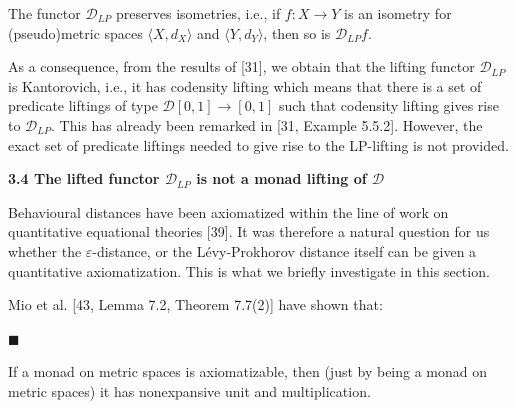 \documentclass[10pt,a4paper]{article}
\begin{document}
 
The functor $\mathcal{D}_{LP}$ preserves isometries, i.e., if $f\colon X\to Y$ is an isometry for (pseudo)metric spaces $\langle X,d_{X}\rangle$ and $\langle Y,d_{Y}\rangle$, then so is $\mathcal{D}_{LP}f$.\par
 
 
 
 
As a consequence, from the results of [31], we obtain that the lifting functor $\mathcal{D}_{LP}$ is Kantorovich, i.e., it has codensity lifting which means that there is a set of predicate liftings of type $\mathcal{D}[0,1]\to[0,1]$ such that codensity lifting gives rise to $\mathcal{D}_{LP}$. This has already been remarked in [31, Example 5.5.2]. However, the exact set of predicate liftings needed to give rise to the LP-lifting is not provided.\par
 
 
 
 
\par\medskip\noindent\textbf{3.4 The lifted functor $\mathcal{D}_{LP}$ is not a monad lifting of $\mathcal{D}$}\par
 
 
Behavioural distances have been axiomatized within the line of work on quantitative equational theories [39]. It was therefore a natural question for us whether the $\varepsilon$-distance, or the Lévy-Prokhorov distance itself can be given a quantitative axiomatization. This is what we briefly investigate in this section.\par
 
 
 
Mio et al. [43, Lemma 7.2, Theorem 7.7(2)] have shown that:\par
  
\par\noindent  $\blacksquare$ 
 
If a monad on metric spaces is axiomatizable, then (just by being a monad on metric spaces) it has nonexpansive unit and multiplication.\par
 
 
\end{document}

